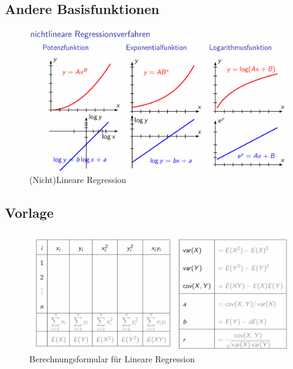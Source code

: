 \documentclass[../Main.tex]{subfiles}
\begin{document}
\subsection{Andere Basisfunktionen}
\begin{figure}[H]
    \centering  %
    \includegraphics[height=0.5\textwidth]{Images/nichtlineare_regression.png}
    \caption{(Nicht)Lineare Regression}
\end{figure}
\newpage
\subsection{Vorlage}
\begin{figure}[H]
    \centering
    \includegraphics[angle=90,height=1\textwidth]{Images/berechnungsformular-lineare-regression.png}
    \caption{Berechnungsformular für Lineare Regression}
\end{figure}
\newpage
\end{document}
